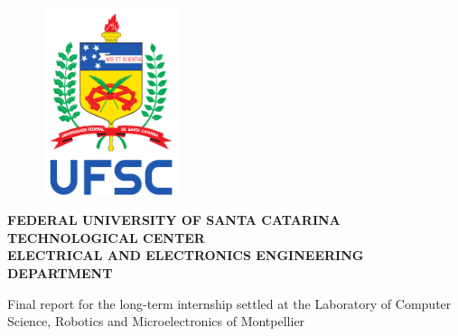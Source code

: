 %
%
%
%
%

%
%
%
%
%

\begin{titlepage}
    \thispagestyle{empty}

    \begin{figure}[!ht]
        \begin{center}
            \includegraphics[width=4cm]{figures/ufsc.pdf}
        \end{center}
    \end{figure}

    \begin{center}
        \normalsize{\textbf{FEDERAL UNIVERSITY OF SANTA CATARINA}} \\
        \normalsize{\textbf{TECHNOLOGICAL CENTER}} \\
        \normalsize{\textbf{ELECTRICAL AND ELECTRONICS ENGINEERING DEPARTMENT}} \\
    \end{center}

    \vfill
    \vfill

    \begin{center}
        \normalsize{\textbf{\thetitle}}
    \end{center}

    \vfill
    
    \begin{center}
        \large{Final report for the long-term internship settled at the Laboratory of Computer Science, Robotics and Microelectronics of Montpellier}
    \end{center}


\end{titlepage}
